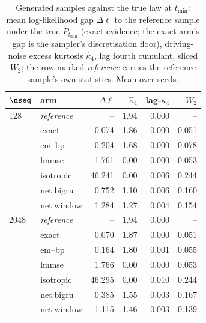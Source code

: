 \begin{table}[t]\centering\small\setlength{\tabcolsep}{4pt}
\caption{Generated samples against the true law at $t_{\min}$: mean log-likelihood gap $\Delta\ell$ to the reference sample under the true $P_{t_{\min}}$ (exact evidence; the exact arm's gap is the sampler's discretisation floor), driving-noise excess kurtosis $\hat\kappa_4$, lag fourth cumulant, sliced $W_2$; the row marked \emph{reference} carries the reference sample's own statistics. Mean over seeds.}
\label{tab:generation}
\begin{tabular}{@{}llrrrr@{}}
\toprule
$\nseq$ & arm & $\Delta\ell$ & $\hat\kappa_4$ & lag-$\kappa_4$ & $W_2$ \\
\midrule
128 & \emph{reference} & -- & 1.94 & 0.000 & -- \\
 & exact & 0.074 & 1.86 & 0.000 & 0.051 \\
 & em--bp & 0.204 & 1.68 & 0.000 & 0.078 \\
 & lmmse & 1.761 & 0.00 & 0.000 & 0.053 \\
 & isotropic & 46.241 & 0.00 & 0.006 & 0.244 \\
 & net:bigru & 0.752 & 1.10 & 0.006 & 0.160 \\
 & net:window & 1.284 & 1.27 & 0.004 & 0.154 \\
\midrule
2048 & \emph{reference} & -- & 1.94 & 0.000 & -- \\
 & exact & 0.070 & 1.87 & 0.000 & 0.051 \\
 & em--bp & 0.164 & 1.80 & 0.001 & 0.055 \\
 & lmmse & 1.766 & 0.00 & 0.000 & 0.053 \\
 & isotropic & 46.295 & 0.00 & 0.010 & 0.244 \\
 & net:bigru & 0.385 & 1.55 & 0.003 & 0.167 \\
 & net:window & 1.115 & 1.46 & 0.003 & 0.139 \\
\bottomrule
\end{tabular}
\end{table}
